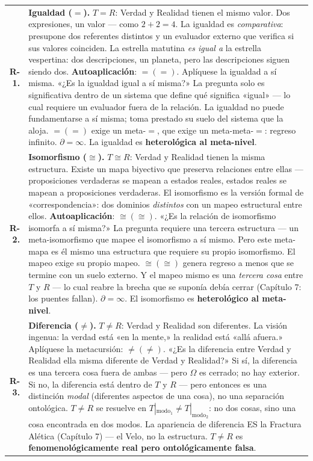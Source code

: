 \documentclass[10pt, openany, oneside]{book}
\renewcommand{\footnotesize}{\fontsize{8.5}{11}\selectfont}
\begin{document}
{\footnotesize
\noindent\begin{tabular}{r p{}}
\textbf{R-1.} & \textbf{Igualdad ($=$).} $T = R$: Verdad y Realidad tienen el mismo valor. Dos expresiones, un valor --- como $2+2 = 4$. La igualdad es \textit{comparativa}: presupone dos referentes distintos y un evaluador externo que verifica si sus valores coinciden. La estrella matutina \textit{es igual a} la estrella vespertina: dos descripciones, un planeta, pero las descripciones siguen siendo dos. \textbf{Autoaplicación}: $=(=)$. Aplíquese la igualdad a sí misma. «¿Es la igualdad igual a sí misma?» La pregunta solo es significativa dentro de un sistema que define qué significa «igual» --- lo cual requiere un evaluador fuera de la relación. La igualdad no puede fundamentarse a sí misma; toma prestado su suelo del sistema que la aloja. $=(=)$ exige un meta-$=$, que exige un meta-meta-$=$: regreso infinito. $\partial = \infty$. La igualdad es \textbf{heterológica al meta-nivel}. \\[0.5em]

\textbf{R-2.} & \textbf{Isomorfismo ($\cong$).} $T \cong R$: Verdad y Realidad tienen la misma estructura. Existe un mapa biyectivo que preserva relaciones entre ellas --- proposiciones verdaderas se mapean a estados reales, estados reales se mapean a proposiciones verdaderas. El isomorfismo es la versión formal de «correspondencia»: dos dominios \textit{distintos} con un mapeo estructural entre ellos. \textbf{Autoaplicación}: $\cong(\cong)$. «¿Es la relación de isomorfismo isomorfa a sí misma?» La pregunta requiere una tercera estructura --- un meta-isomorfismo que mapee el isomorfismo a sí mismo. Pero este meta-mapa es él mismo una estructura que requiere su propio isomorfismo. El mapeo exige su propio mapeo. $\cong(\cong)$ genera regreso a menos que se termine con un suelo externo. Y el mapeo mismo es una \textit{tercera cosa} entre $T$ y $R$ --- lo cual reabre la brecha que se suponía debía cerrar (Capítulo 7: los puentes fallan). $\partial = \infty$. El isomorfismo es \textbf{heterológico al meta-nivel}. \\[0.5em]

\textbf{R-3.} & \textbf{Diferencia ($\neq$).} $T \neq R$: Verdad y Realidad son diferentes. La visión ingenua: la verdad está «en la mente,» la realidad está «allá afuera.» Aplíquese la metacursión: $\neq(\neq)$. «¿Es la diferencia entre Verdad y Realidad ella misma diferente de Verdad y Realidad?» Si sí, la diferencia es una tercera cosa fuera de ambas --- pero $\Omega$ es cerrado; no hay exterior. Si no, la diferencia está dentro de $T$ y $R$ --- pero entonces es una distinción \textit{modal} (diferentes aspectos de una cosa), no una separación ontológica. $T \neq R$ se resuelve en $T|_{\text{modo}_1} \neq T|_{\text{modo}_2}$: no dos cosas, sino una cosa encontrada en dos modos. La apariencia de diferencia ES la Fractura Alética (Capítulo 7) --- el Velo, no la estructura. $T \neq R$ es \textbf{fenomenológicamente real pero ontológicamente falsa}. \\[0.5em]


\end{tabular}}
\end{document}
